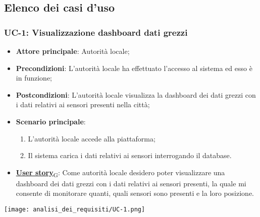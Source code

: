 \subsection{Elenco dei casi d'uso}
\subsubsection{UC-1: Visualizzazione dashboard dati grezzi}
\begin{itemize}
	\item \textbf{Attore principale}: Autorità locale;
	\item \textbf{Precondizioni}: L'autorità locale ha effettuato l'accesso al sistema ed esso è in funzione;
	\item \textbf{Postcondizioni}: L'autorità locale visualizza la dashboard dei dati grezzi con i dati relativi ai sensori
	      presenti nella città;
	\item \textbf{Scenario principale}:
	      \begin{enumerate}
		      \item L'autorità locale accede alla piattaforma;
		      \item Il sistema carica i dati relativi ai sensori interrogando il database.
	      \end{enumerate}
	\item \href{https://7last.github.io/docs/rtb/documentazione-interna/glossario\#user-story}{\textbf{User story}\textsubscript{G}}: Come autorità locale desidero poter visualizzare una dashboard dei dati grezzi con i dati relativi ai sensori presenti,
	      la quale mi consente di monitorare quanti, quali sensori sono presenti e la loro posizione.
\end{itemize}
\begin{center}
	\texttt{[image: analisi\_dei\_requisiti/UC-1.png]}
\end{center}

